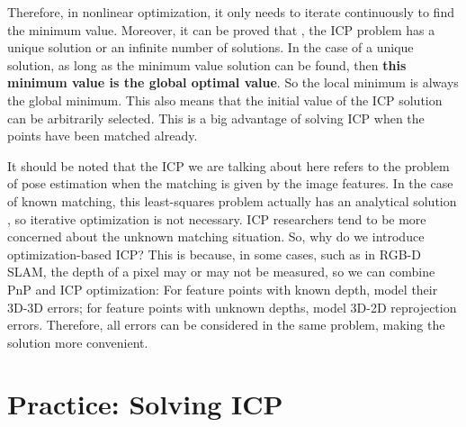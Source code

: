 Therefore, in nonlinear optimization, it only needs to iterate continuously to find the minimum value. Moreover, it can be proved that  {\cite{Barfoot2016}}, the ICP problem has a unique solution or an infinite number of solutions. In the case of a unique solution, as long as the minimum value solution can be found, then \textbf{this minimum value is the global optimal value}. So the local minimum is always the global minimum. This also means that the initial value of the ICP solution can be arbitrarily selected. This is a big advantage of solving ICP when the points have been matched already.

It should be noted that the ICP we are talking about here refers to the problem of pose estimation when the matching is given by the image features. In the case of known matching, this least-squares problem actually has an analytical solution  {\cite{Faugeras1986, Horn1987, Sharp2002}}, so iterative optimization is not necessary. ICP researchers tend to be more concerned about the unknown matching situation. So, why do we introduce optimization-based ICP? This is because, in some cases, such as in RGB-D SLAM, the depth of a pixel may or may not be measured, so we can combine PnP and ICP optimization: For feature points with known depth, model their 3D-3D errors; for feature points with unknown depths, model 3D-2D reprojection errors. Therefore, all errors can be considered in the same problem, making the solution more convenient.

\section{Practice: Solving ICP}
